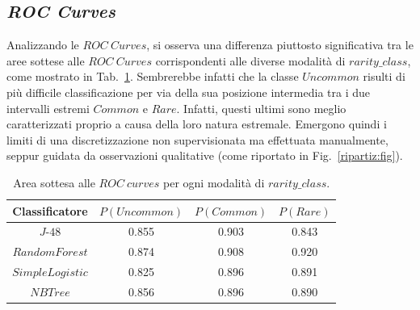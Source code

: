 \documentclass[fleqn,10pt]{SelfArx} %
\begin{document}
\newpage
\subsection{\textit{ROC Curves}}
Analizzando le $ROC\ Curves$, si osserva una differenza piuttosto significativa tra le aree sottese alle $ROC\ Curves$ corrispondenti alle diverse modalità di $rarity\_class$, come mostrato in Tab.~\ref{Roc_rarity:tab}.
Sembrerebbe infatti che la classe $Uncommon$ risulti di più difficile classificazione per via della sua posizione intermedia tra i due intervalli estremi $Common$ e $Rare$. Infatti, questi ultimi sono meglio caratterizzati proprio a causa della loro natura estremale. 
Emergono quindi i limiti di una discretizzazione non supervisionata ma effettuata manualmente, seppur guidata da osservazioni qualitative (come riportato in Fig.~\ref{ripartiz:fig}).
\begin{table}
\begin{center}
\begin {tabular}{c | c | c |c}
\hline
\hline
Classificatore & $P(Uncommon)$&$P(Common)$ & $P(Rare)$\\
\hline
$J$-$48$ &0.855& 0.903 &0.843\\
$RandomForest$& 0.874& 0.908&0.920\\
$SimpleLogistic$&0.825& 0.896& 0.891\\
$NBTree$&0.856& 0.896& 0.890\\
\hline
\hline
\end{tabular}
\end{center}
\caption{\label{Roc_rarity:tab}
Area sottesa alle $ROC\ curves$ per ogni modalità di $rarity\_class$.}
\end{table}

\end{document}
